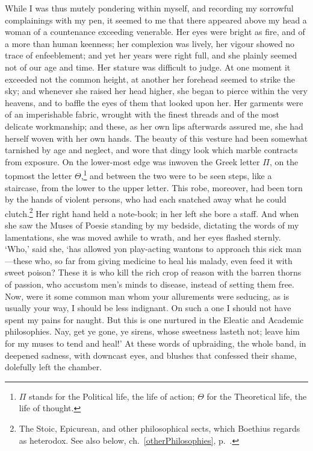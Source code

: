 \documentclass[12pt]{book}
\begin{document}
While I was thus mutely pondering within myself, and recording       
my sorrowful complainings with my pen, it seemed to me that there       
appeared above my head a woman of a countenance exceeding venerable.    
Her eyes were bright as fire, and of a more than human keenness; her    
complexion was lively, her vigour showed no trace of enfeeblement; and  
yet her years were right full, and she plainly seemed not of our age    
and time. Her stature was difficult to judge. At one moment it exceeded 
not the common height, at another her forehead seemed to strike the     
sky; and whenever she raised her head higher, she began to pierce       
within the very heavens, and to baffle the eyes of them that looked     
upon her. Her garments were of an imperishable fabric, wrought with     
the finest threads and of the most delicate workmanship; and these,     
as her own lips afterwards assured me, she had herself woven with her   
own hands. The beauty of this vesture had been somewhat tarnished by    
age and neglect, and wore that dingy look which marble contracts from   
exposure. On the lower-most edge was inwoven the Greek letter $\Pi$,    
on the topmost the letter $\Theta$,\footnote{$\Pi$ stands for the       
Political life, the life of action; $\Theta$ for the Theoretical life,  
the life of thought.} and between the two were to be seen steps, like   
a staircase, from the lower to the upper letter. This robe, moreover,   
had been torn by the hands of violent persons, who had each snatched    
away what he could clutch.\footnote{The Stoic, Epicurean, and other     
philosophical sects, which Boethius regards as heterodox. See also      
below, ch.~\ref{otherPhilosophies}, p.~\pageref{otherPhilosophies}.}    
Her right hand held a note-book; in her left she bore a staff. And      
when she saw the Muses of Poesie standing by my bedside, dictating the  
words of my lamentations, she was moved awhile to wrath, and her eyes   
flashed sternly. `Who,' said she, `has allowed yon play-acting wantons  
to approach this sick man---these who, so far from giving medicine to    
heal his malady, even feed it with sweet poison? These it is who kill   
the rich crop of reason with the barren thorns of passion, who accustom 
men's minds to disease, instead of setting them free. Now, were it some 
common man whom your allurements were seducing, as is usually your way, 
I should be less indignant. On such a one I should not have spent my    
pains for naught. But this is one nurtured in the Eleatic and Academic  
philosophies. Nay, get ye gone, ye sirens, whose sweetness lasteth not; 
leave him for my muses to tend and heal!' At these words of upbraiding, 
the whole band, in deepened sadness, with downcast eyes, and blushes    
that confessed their shame, dolefully left the chamber.                 
\end{document}
